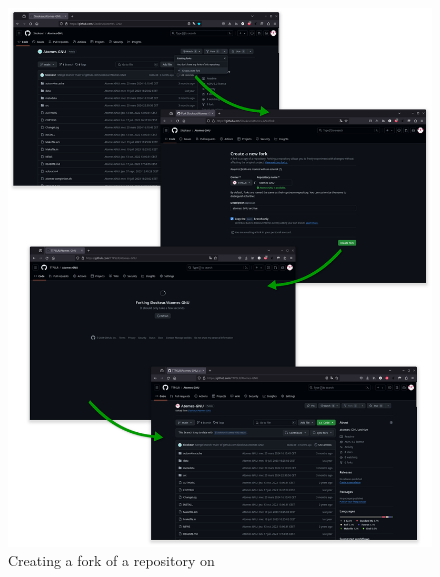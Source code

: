 \begin{figure}[!p]
\includegraphics[width=1.0\textwidth,keepaspectratio=true,draft=\ddst]{img/hosts/github/fork.eps} 
\caption{Creating a fork of a repository on \github\label{fgithub}}
\end{figure}
